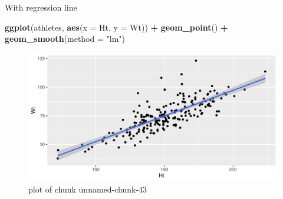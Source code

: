 \documentclass[
  ignorenonframetext,
]{beamer}
\newenvironment{Shaded}{\begin{snugshade}}{\end{snugshade}}
\newcommand{\DataTypeTok}[1]{\textcolor[rgb]{0.13,0.29,0.53}{#1}}
\newcommand{\KeywordTok}[1]{\textcolor[rgb]{0.13,0.29,0.53}{\textbf{#1}}}
\newcommand{\NormalTok}[1]{#1}
\newcommand{\OperatorTok}[1]{\textcolor[rgb]{0.81,0.36,0.00}{\textbf{#1}}}
\newcommand{\StringTok}[1]{\textcolor[rgb]{0.31,0.60,0.02}{#1}}
\begin{document}
\begin{frame}[fragile]{With regression line}
\protect\hypertarget{with-regression-line}{}

\begin{Shaded}
\begin{Highlighting}[]
\KeywordTok{ggplot}\NormalTok{(athletes, }\KeywordTok{aes}\NormalTok{(}\DataTypeTok{x =}\NormalTok{ Ht, }\DataTypeTok{y =}\NormalTok{ Wt)) }\OperatorTok{+}
\StringTok{  }\KeywordTok{geom_point}\NormalTok{() }\OperatorTok{+}\StringTok{ }\KeywordTok{geom_smooth}\NormalTok{(}\DataTypeTok{method =} \StringTok{"lm"}\NormalTok{)}
\end{Highlighting}
\end{Shaded}

\begin{figure}
\centering
\includegraphics{figure/unnamed-chunk-43-1.pdf}
\caption{plot of chunk unnamed-chunk-43}
\end{figure}

\end{frame}
\end{document}
